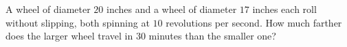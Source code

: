 A wheel of diameter $20$ inches and a wheel of diameter $17$ inches each roll without slipping, both spinning at $10$ revolutions per second. How much farther does the larger wheel travel in $30$ minutes than the smaller one?
